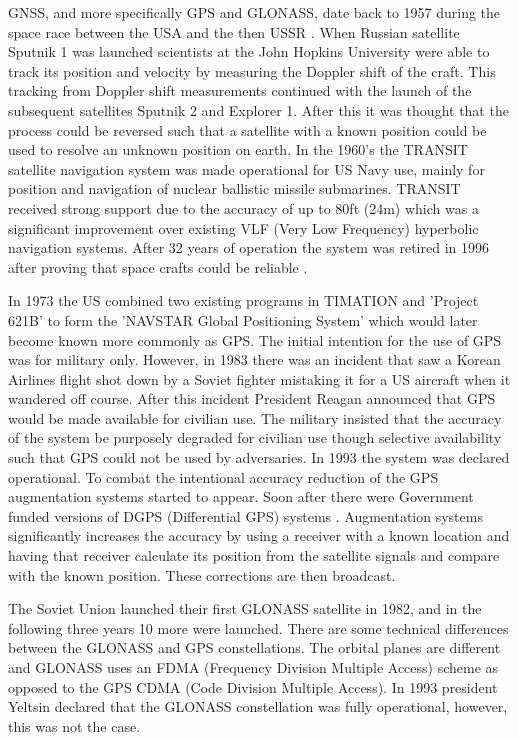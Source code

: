 GNSS, and more specifically GPS and GLONASS, date back to 1957 during the space race between the USA and the then USSR \cite{RN43}. When Russian satellite Sputnik 1 was
launched scientists at the John Hopkins University were able to track its position and velocity by measuring the Doppler shift of the craft. This tracking from Doppler
shift measurements continued with the launch of the subsequent satellites Sputnik 2 and Explorer 1. After this it was thought that the process could be reversed such that
a satellite with a known position could be used to resolve an unknown position on earth. In the 1960's the TRANSIT satellite navigation system was made operational for US
Navy use, mainly for position and navigation of nuclear ballistic missile submarines. TRANSIT received strong support due to the accuracy of up to 80ft (24m) which was a
significant improvement over existing VLF (Very Low Frequency) hyperbolic navigation systems. After 32 years of operation the system was retired in 1996 after proving
that space crafts could be reliable \cite{RN45}. 

In 1973 the US combined two existing programs in TIMATION and 'Project 621B' to form the 'NAVSTAR Global Positioning System' which would later become known more
commonly as GPS. The initial intention for the use of GPS was for military only. However, in 1983 there was an incident that saw a Korean Airlines flight shot down by a
Soviet fighter mistaking it for a US aircraft when it wandered off course. After this incident President Reagan announced that GPS would be made available for civilian
use. The military insisted that the accuracy of the system be purposely degraded for civilian use though selective availability such that GPS could not be used by
adversaries. In 1993 the system was declared operational. To combat the intentional accuracy reduction of the GPS augmentation systems started to appear. Soon
after there were Government funded versions of DGPS (Differential GPS) systems \cite{RN43}. Augmentation systems significantly increases the accuracy by using a receiver
with a known location and having that receiver calculate its position from the satellite signals and compare with the known position. These corrections are then
broadcast. 

The Soviet Union launched their first GLONASS satellite in 1982, and in the following three years 10 more were launched. There are some technical differences between the
GLONASS and GPS constellations. The orbital planes are different and GLONASS uses an FDMA (Frequency Division Multiple Access) scheme as opposed to the GPS CDMA (Code
Division Multiple Access). In 1993 president Yeltsin declared that the GLONASS constellation was fully operational, however, this was not the case. 

